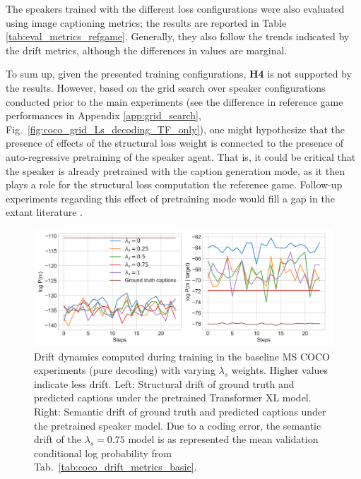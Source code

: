 The speakers trained with the different loss configurations were also evaluated using image captioning metrics; the results are reported in Table \ref{tab:eval_metrics_refgame}. Generally, they also follow the trends indicated by the drift metrics, although the differences in values are marginal.

To sum up, given the presented training configurations, \textbf{H4} is not supported by the results. However, based on the grid search over speaker configurations conducted prior to the main experiments (see the difference in reference game performances in Appendix \ref{app:grid_search}, Fig.~\ref{fig:coco_grid_Ls_decoding_TF_only}), one might hypothesize that the presence of effects of the structural loss weight is connected to the presence of auto-regressive pretraining of the speaker agent. That is, it could be critical that the speaker is already pretrained with the caption generation mode, as it then plays a role for the structural loss computation the reference game. Follow-up experiments regarding this effect of pretraining mode would fill a gap in the extant literature \parencite[but see][for related work]{lowe2020interaction}.

\begin{figure}
	\centering
	\includegraphics[width=\linewidth]{images/coco_structural_semantic_drift_4000_pure_L_S_all_random.png}
	\caption{Drift dynamics computed during training in the baseline MS COCO experiments (pure decoding) with varying $\lambda_s$ weights. Higher values indicate less drift. Left: Structural drift of ground truth and predicted captions under the pretrained Transformer XL model. Right: Semantic drift of ground truth and predicted captions under the pretrained speaker model. Due to a coding error, the semantic drift of the $\lambda_s = 0.75$ model is as represented the mean validation conditional log probability from Tab.~\ref{tab:coco_drift_metrics_basic}.}
	\label{fig:coco_baseline_str_sem_drift_all}
\end{figure}


